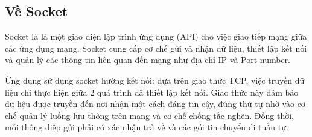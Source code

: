 \subsection{Về Socket}
Socket là là một giao diện lập trình ứng dụng (API) cho việc giao tiếp mạng giữa các ứng dụng mạng. Socket cung cấp cơ chế gửi và nhận dữ liệu, thiết lập kết nối và quản lý các thông tin liên quan đến mạng như địa chỉ IP và Port number.

Ứng dụng sử dụng socket hướng kết nối: dựa trên giao thức TCP, việc truyền dữ liệu
chỉ thực hiện giữa 2 quá trình đã thiết lập kết nối. Giao thức này đảm bảo dữ liệu được
truyền đến nơi nhận một cách đáng tin cậy, đúng thứ tự nhờ vào cơ chế quản lý luồng
lưu thông trên mạng và cơ chế chống tắc nghẽn. Đồng thời, mỗi thông điệp gửi phải có
xác nhận trả về và các gói tin chuyển đi tuần tự.